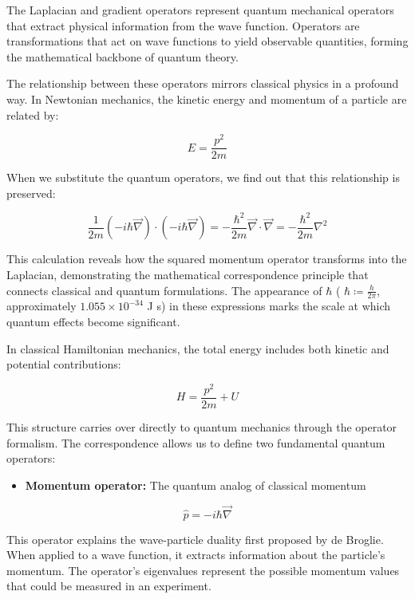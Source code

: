 The Laplacian and gradient operators represent quantum mechanical operators that extract physical information from the wave function. Operators are transformations that act on wave functions to yield observable quantities, forming the mathematical backbone of quantum theory.

The relationship between these operators mirrors classical physics in a profound way. In Newtonian mechanics, the kinetic energy and momentum of a particle are related by:

\begin{equation}
E=\frac{p^{2}}{2 m}
\end{equation}

When we substitute the quantum operators, we find out that this relationship is preserved:

\begin{equation}
\frac{1}{2 m}(-i \hbar \vec{\nabla}) \cdot(-i \hbar \vec{\nabla})=-\frac{\hbar^{2}}{2 m} \vec{\nabla} \cdot \vec{\nabla}=-\frac{\hbar^{2}}{2 m} \nabla^{2}
\end{equation}

This calculation reveals how the squared momentum operator transforms into the Laplacian, demonstrating the mathematical correspondence principle that connects classical and quantum formulations. The appearance of $\hbar$ ( $\hbar \coloneqq \frac{h}{2\pi}$, approximately $1.055 \times 10^{-34}$ J s) in these expressions marks the scale at which quantum effects become significant.

In classical Hamiltonian mechanics, the total energy includes both kinetic and potential contributions:

\begin{equation}
H=\frac{p^{2}}{2 m}+U
\end{equation}

This structure carries over directly to quantum mechanics through the operator formalism. The correspondence allows us to define two fundamental quantum operators:

\begin{itemize}
  \item \textbf{Momentum operator:} The quantum analog of classical momentum
\end{itemize}

\begin{equation}
\hat{p}=-i \hbar \vec{\nabla}
\end{equation}

This operator explains the wave-particle duality first proposed by de Broglie. When applied to a wave function, it extracts information about the particle's momentum. The operator's eigenvalues represent the possible momentum values that could be measured in an experiment.

